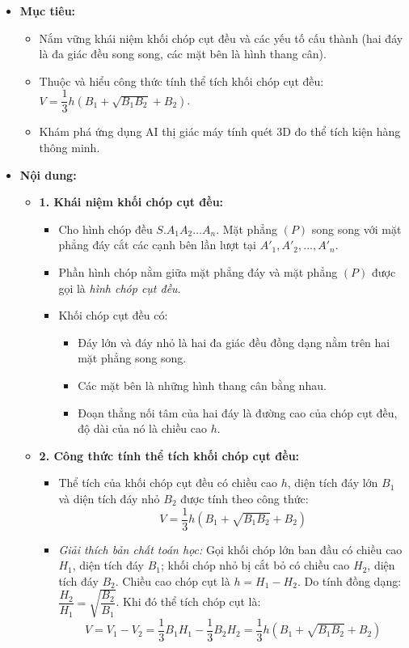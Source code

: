 \documentclass[12pt, a4paper]{article}
\begin{document}
\begin{itemize}[leftmargin=1.2cm]
    \item[a)] \textbf{Mục tiêu:}
    \begin{itemize}[leftmargin=0.6cm]
        \item Nắm vững khái niệm khối chóp cụt đều và các yếu tố cấu thành (hai đáy là đa giác đều song song, các mặt bên là hình thang cân).
        \item Thuộc và hiểu công thức tính thể tích khối chóp cụt đều: $V = \dfrac{1}{3} h \left( B_1 + \sqrt{B_1 B_2} + B_2 \right)$.
        \item Khám phá ứng dụng AI thị giác máy tính quét 3D đo thể tích kiện hàng thông minh.
    \end{itemize}

    \item[b)] \textbf{Nội dung:}
    \begin{itemize}[leftmargin=0.6cm]
        \item \textbf{1. Khái niệm khối chóp cụt đều:}
        \begin{itemize}
            \item Cho hình chóp đều $S.A_1 A_2 \dots A_n$. Mặt phẳng $(P)$ song song với mặt phẳng đáy cắt các cạnh bên lần lượt tại $A'_1, A'_2, \dots, A'_n$.
            \item Phần hình chóp nằm giữa mặt phẳng đáy và mặt phẳng $(P)$ được gọi là \textit{hình chóp cụt đều}.
            \item Khối chóp cụt đều có:
            \begin{itemize}
                \item Đáy lớn và đáy nhỏ là hai đa giác đều đồng dạng nằm trên hai mặt phẳng song song.
                \item Các mặt bên là những hình thang cân bằng nhau.
                \item Đoạn thẳng nối tâm của hai đáy là đường cao của chóp cụt đều, độ dài của nó là chiều cao $h$.
            \end{itemize}
        \end{itemize}

        \item \textbf{2. Công thức tính thể tích khối chóp cụt đều:}
        \begin{itemize}
            \item Thể tích của khối chóp cụt đều có chiều cao $h$, diện tích đáy lớn $B_1$ và diện tích đáy nhỏ $B_2$ được tính theo công thức:
            $$V = \dfrac{1}{3} h \left( B_1 + \sqrt{B_1 B_2} + B_2 \right)$$
            \item \textit{Giải thích bản chất toán học:} Gọi khối chóp lớn ban đầu có chiều cao $H_1$, diện tích đáy $B_1$; khối chóp nhỏ bị cắt bỏ có chiều cao $H_2$, diện tích đáy $B_2$.
            Chiều cao chóp cụt là $h = H_1 - H_2$. Do tính đồng dạng: $\dfrac{H_2}{H_1} = \sqrt{\dfrac{B_2}{B_1}}$.
            Khi đó thể tích chóp cụt là:
            $$V = V_1 - V_2 = \dfrac{1}{3} B_1 H_1 - \dfrac{1}{3} B_2 H_2 = \dfrac{1}{3} h \left( B_1 + \sqrt{B_1 B_2} + B_2 \right)$$
        \end{itemize}
    \end{itemize}


\end{itemize}
\end{document}
